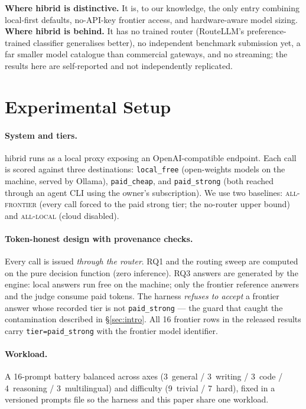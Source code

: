 \documentclass[10pt]{article} %
\begin{document}
\textbf{Where hibrid is distinctive.} It is, to our knowledge, the only entry combining local-first defaults, no-API-key frontier access, and hardware-aware model sizing. \textbf{Where hibrid is behind.} It has no trained router (RouteLLM's preference-trained classifier generalises better), no independent benchmark submission yet, a far smaller model catalogue than commercial gateways, and no streaming; the results here are self-reported and not independently replicated.

\section{Experimental Setup}
\label{sec:setup}

\paragraph{System and tiers.} hibrid runs as a local proxy exposing an OpenAI-compatible endpoint. Each call is scored against three destinations: \texttt{local\_free} (open-weights models on the machine, served by Ollama), \texttt{paid\_cheap}, and \texttt{paid\_strong} (both reached through an agent CLI using the owner's subscription). We use two baselines: \textsc{all-frontier} (every call forced to the paid strong tier; the no-router upper bound) and \textsc{all-local} (cloud disabled).

\paragraph{Token-honest design with provenance checks.} Every call is issued \emph{through the router}. RQ1 and the routing sweep are computed on the pure decision function (zero inference). RQ3 answers are generated by the engine: local answers run free on the machine; only the frontier reference answers and the judge consume paid tokens. The harness \emph{refuses to accept} a frontier answer whose recorded tier is not \texttt{paid\_strong} --- the guard that caught the contamination described in \S\ref{sec:intro}. All 16 frontier rows in the released results carry \texttt{tier=paid\_strong} with the frontier model identifier.

\paragraph{Workload.} A 16-prompt battery balanced across axes (3~general / 3~writing / 3~code / 4~reasoning / 3~multilingual) and difficulty (9~trivial / 7~hard), fixed in a versioned prompts file so the harness and this paper share one workload.
\end{document}
